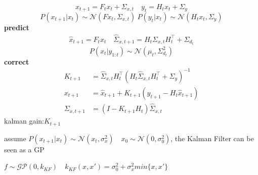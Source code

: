 \documentclass[landscape,a0paper,fontscale=0.285]{baposter} %
\begin{document}
\begin{poster}
{\colorbox[HTML]{CCFFFF}{}
$$
x_{t+1} = F_tx_{t} + \Sigma_{x,t} \quad y_t  = H_t x_t + \Sigma_y
$$
$$
P(x_{t+1}|x_t) \sim \mathcal N(Fx_t, \Sigma_{x,t})
~
P(y_t | x_t) \sim \mathcal N(H_t x_t, \Sigma_y)
$$
\textbf{predict}
$$
\begin{aligned}
\hat x_{t+1} = F_t x_t \quad \hat \Sigma_{x,t+1} = H_t \Sigma_{x,t}H_t^\top + \Sigma_{d_t}
\end{aligned}
$$
$$
P(x_t|y_{1:t}) \sim \mathcal N(\mu_t, \Sigma_{d_t}^2)
$$
\textbf{correct}
$$
\begin{aligned}
K_{t+1} &= \hat \Sigma_{x,t}H_t^\top (H_t\hat \Sigma_{x,t}H_t^\top + \Sigma_y)^{-1}
\\
x_{t+1} &= \hat x_{t+1} + K_{t+1}(y_{t+1}-H_t\hat x_{t+1})\\
\Sigma_{x,t+1} &= (I-K_{t+1}H_t)\hat \Sigma_{x,t}
\end{aligned}
$$
kalman gain:$K_{t+1}$

assume $P(x_{t+1}|x_t)\sim\mathcal N(x_t,\sigma_x^2)\quad x_0\sim\mathcal N(0,\sigma_0^2)$, the Kalman Filter can be seen as a GP 

$f\sim \mathcal{GP}(0, k_{KF})\quad k_{KF}(x,x') = \sigma_0^2 + \sigma_x^2 min\{x,x'\}$
}


\end{poster}
\end{document}
